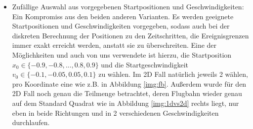 \begin{description}
\begin{itemize}
		\item Zufällige Auswahl aus vorgegebenen Startpositionen und Geschwindigkeiten: Ein Kompromiss aus den beiden anderen Varianten. Es werden geeignete Startpositionen und Geschwindigkeiten vorgegeben, sodass auch bei der diskreten Berechnung der Positionen zu den Zeitschritten, die Ereignisgrenzen immer exakt erreicht werden, anstatt sie zu überschreiten. Eine der Möglichkeiten und auch von uns verwendete ist hierzu, die Startposition $ x_{0} \in \{-0.9,-0.8, ... ,0.8,0.9\} $ und die Startgeschwindigkeit $ v_{0} \in \{-0.1,-0.05,0.05,0.1\} $ zu wählen. Im 2D Fall natürlich jeweils 2 wählen, pro Koordinate eine wie z.B. in Abbildung \ref{img:fb}. Außerdem wurde für den 2D Fall noch genau die Teilmenge betrachtet, deren Flugbahn wieder genau auf dem Standard Quadrat wie in Abbildung \ref{img:1dvs2d} rechts liegt, nur eben in beide Richtungen und in 2 verschiedenen Geschwindigkeiten durchlaufen. 
		

\end{itemize}
\end{description}
